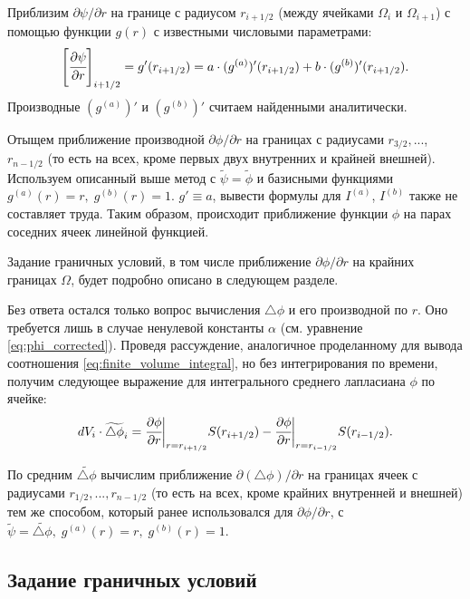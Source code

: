 Приблизим $\partial \psi / \partial r$ на границе с радиусом $r_{i + 1/2}$ (между ячейками $\Omega_i$ и $\Omega_{i + 1}$) с помощью функции $g(r)$ с известными числовыми параметрами:
$$\left[ \cfrac{\partial \psi}{\partial r} \right]_{i + 1/2} = g'(r_{i + 1/2}) = a \cdot (g^{(a)})'(r_{i + 1/2}) + b \cdot (g^{(b)})'(r_{i + 1/2}) {\text{.}}$$
Производные $(g^{(a)})'$ и $(g^{(b)})'$ считаем найденными аналитически.

Отыщем приближение производной $\partial \phi / \partial r$ на границах с радиусами $r_{3/2}, ...$, $r_{n - 1/2}$ (то есть на всех, кроме первых двух внутренних и крайней внешней). Используем описанный выше метод с $\widetilde{\psi} = \widetilde{\phi}$ и базисными функциями $g^{(a)}(r) = r, \; g^{(b)}(r) = 1$. $g' \equiv a$, вывести формулы для $I^{(a)}$, $I^{(b)}$ также не составляет труда. Таким образом, происходит приближение функции $\phi$ на парах соседних ячеек линейной функцией.

Задание граничных условий, в том числе приближение $\partial \phi / \partial r$ на крайних границах $\Omega$, будет подробно описано в следующем разделе.

Без ответа остался только вопрос вычисления $\triangle \phi$ и его производной по $r$. Оно требуется лишь в случае ненулевой константы $\alpha$ (см. уравнение \eqref{eq:phi_corrected}). Проведя рассуждение, аналогичное проделанному для вывода соотношения \eqref{eq:finite_volume_integral}, но без интегрирования по времени, получим следующее выражение для интегрального среднего лапласиана $\phi$ по ячейке:
\begin{equation}
    dV_i \cdot \widetilde{\triangle \phi}_i = \cfrac{\partial \phi}{\partial r} \bigg|_{r = r_{i + 1/2}} S(r_{i + 1/2}) - \cfrac{\partial \phi}{\partial r} \bigg|_{r = r_{i - 1/2}} S(r_{i - 1/2}) {\text{.}}
    \label{eq:finite_volume_laplasian}
\end{equation}

По средним $\widetilde{\triangle \phi}$ вычислим приближение $\partial (\triangle \phi) / \partial r$ на границах ячеек с радиусами $r_{1/2}, ..., r_{n - 1/2}$ (то есть на всех, кроме крайних внутренней и внешней) тем же способом, который ранее использовался для $\partial \phi / \partial r$, с $\widetilde{\psi} = \widetilde{\triangle \phi}, \; g^{(a)}(r) = r, \; g^{(b)}(r) = 1$.


\subsection{Задание граничных условий}

